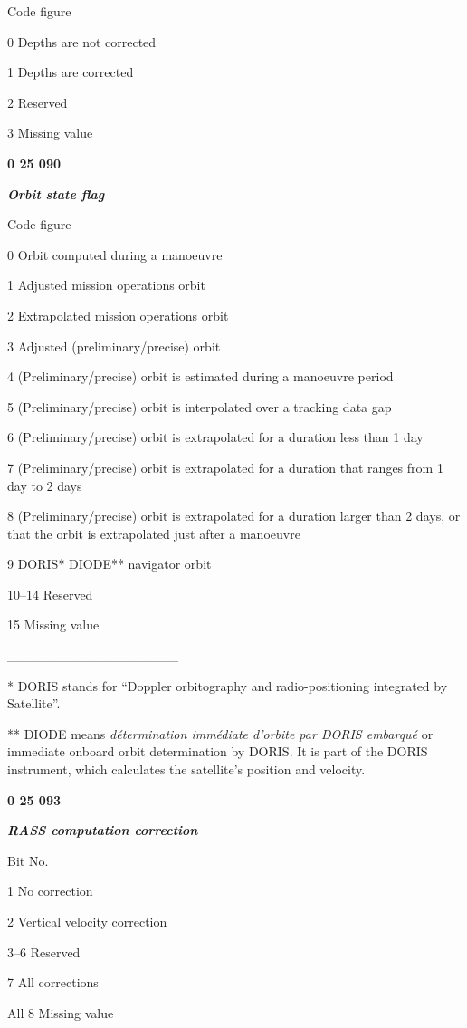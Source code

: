 Code figure

0 Depths are not corrected

1 Depths are corrected

2 Reserved

3 Missing value

\textbf{0 25 090}

\emph{\textbf{Orbit state flag}}

Code figure

0 Orbit computed during a manoeuvre

1 Adjusted mission operations orbit

2 Extrapolated mission operations orbit

3 Adjusted (preliminary/precise) orbit

4 (Preliminary/precise) orbit is estimated during a manoeuvre period

5 (Preliminary/precise) orbit is interpolated over a tracking data gap

6 (Preliminary/precise) orbit is extrapolated for a duration less than 1 day

7 (Preliminary/precise) orbit is extrapolated for a duration that ranges from 1 day to 2 days

8 (Preliminary/precise) orbit is extrapolated for a duration larger than 2 days, or that the orbit is extrapolated just after a manoeuvre

9 DORIS* DIODE** navigator orbit

10--14 Reserved

15 Missing value

\_\_\_\_\_\_\_\_\_\_\_\_\_\_\_\_\_\_

* DORIS stands for ``Doppler orbitography and radio-positioning integrated by Satellite''.

** DIODE means \emph{détermination immédiate d'orbite par DORIS embarqué} or immediate onboard orbit determination by DORIS. It is part of the DORIS instrument, which calculates the satellite's position and velocity.

\textbf{0 25 093}

\emph{\textbf{RASS computation correction}}

Bit No.

1 No correction

2 Vertical velocity correction

3--6 Reserved

7 All corrections

All 8 Missing value

